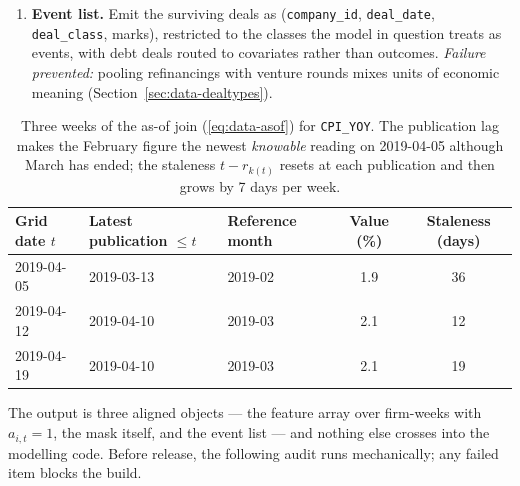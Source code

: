 \begin{enumerate}
at $t$: its first observed deal (or vendor add date) precedes $t$ and no absorbing
M\&A, IPO, or failure event occurred before $t$
(Section~\ref{sec:data-dealtypes}). \emph{Failure prevented:} pre-tracking weeks
pretend the firm was at risk while it was invisible, and post-absorption weeks count
firm-time in which no event could occur; both distort intensity estimates, which is
the risk-set discipline formalized in Chapters~\ref{ch:hawkes}
and~\ref{ch:selection}.
\item \textbf{Event list.} Emit the surviving deals as
(\texttt{company\_id}, \texttt{deal\_date}, \texttt{deal\_class}, marks), restricted
to the classes the model in question treats as events, with debt deals routed to
covariates rather than outcomes. \emph{Failure prevented:} pooling refinancings with
venture rounds mixes units of economic meaning
(Section~\ref{sec:data-dealtypes}).
\end{enumerate}

\begin{table}[htbp]
\centering
\small
\begin{tabular}{lllcc}
\toprule
Grid date $t$ & Latest publication $\le t$ & Reference month & Value (\%) & Staleness (days) \\
\midrule
2019-04-05 & 2019-03-13 & 2019-02 & 1.9 & 36 \\
2019-04-12 & 2019-04-10 & 2019-03 & 2.1 & 12 \\
2019-04-19 & 2019-04-10 & 2019-03 & 2.1 & 19 \\
\bottomrule
\end{tabular}
\caption{Three weeks of the as-of join (\ref{eq:data-asof}) for \texttt{CPI\_YOY}.
The publication lag makes the February figure the newest \emph{knowable} reading on
2019-04-05 although March has ended; the staleness $t - r_{k(t)}$ resets at each
publication and then grows by 7 days per week.}
\label{tab:data-asof-example}
\end{table}

The output is three aligned objects --- the feature array over firm-weeks with
$a_{i,t} = 1$, the mask itself, and the event list --- and nothing else crosses into
the modelling code. Before release, the following audit runs mechanically; any failed
item blocks the build.


